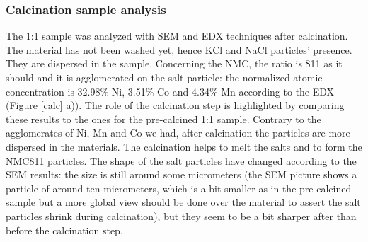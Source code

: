 \documentclass{article}
\begin{document}
\subsubsection{Calcination sample analysis}
The 1:1 sample was analyzed with SEM and EDX techniques after calcination. The material has not been washed yet,
 hence KCl and NaCl particles' presence. They are dispersed in the sample. Concerning the NMC, the ratio is 811 
as it should and it is agglomerated on the salt particle: the normalized atomic concentration is 32.98\% Ni, 
3.51\% Co and 4.34\% Mn according to the EDX (Figure \ref{calc} a)). The role of the calcination step is highlighted by
 comparing these results to the ones for the pre-calcined 1:1 sample. Contrary to the agglomerates of Ni, Mn 
and Co we had, after calcination the particles are more dispersed in the materials. The calcination helps to 
melt the salts and to form the NMC811 particles. The shape of the salt particles have changed according to the 
SEM results: the size is still around some micrometers (the SEM picture shows a particle of around ten micrometers,
 which is a bit smaller as in the pre-calcined sample but a more global view should be done over the material to assert
 the salt particles shrink during calcination), but they seem to be a bit sharper after than before the  calcination step.\\
\end{document}
